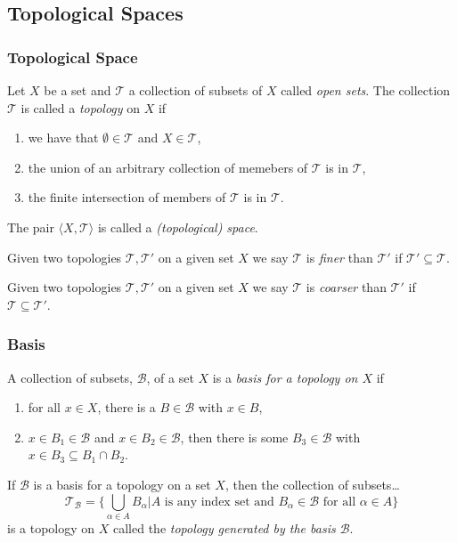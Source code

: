 \subsection{Topological Spaces}

\subsubsection{Topological Space}\label{topologicalspace}
Let $X$ be a set and $\mathcal{T}$ a collection of subsets of $X$ called \emph{open sets}. The collection $\mathcal{T}$ is called a \emph{topology} on $X$ if
\begin{enumerate}
  \item we have that $\emptyset \in \mathcal{T}$ and $X \in \mathcal{T}$,
  \item the union of an arbitrary collection of memebers of $\mathcal{T}$ is in $\mathcal{T}$,
  \item the finite intersection of members of $\mathcal{T}$ is in $\mathcal{T}$.
\end{enumerate}
The pair $\langle X, \mathcal{T} \rangle$ is called a \emph{(topological) space}.

\label{finer}

Given two topologies $\mathcal{T},\mathcal{T}'$ on a given set $X$ we say $\mathcal{T}$ is \emph{finer} than $\mathcal{T}'$ if $\mathcal{T}' \subseteq \mathcal{T}$.

\label{coaser}

Given two topologies $\mathcal{T},\mathcal{T}'$ on a given set $X$ we say $\mathcal{T}$ is \emph{coarser} than $\mathcal{T}'$ if $\mathcal{T} \subseteq \mathcal{T}'$.

\subsubsection{Basis}\label{basis}

A collection of subsets, $\mathcal{B}$, of a set $X$ is a \emph{basis for a topology on $X$} if
\begin{enumerate}
  \item for all $x \in X$, there is a $B \in \mathcal{B}$ with $x \in B$,
  \item $x \in B_1 \in \mathcal{B}$ and $x \in B_2 \in \mathcal{B}$, then there is some $B_3 \in \mathcal{B}$ with $x \in B_3 \subseteq B_1 \cap B_2$.
\end{enumerate}

\begin{proposition}
If $\mathcal{B}$ is a basis for a topology on a set $X$, then the collection of subsets\dots
$$\mathcal{T}_{\mathcal{B}} = \{\bigcup_{\alpha \in A} B_{\alpha} | A \textrm{ is any index set and }B_{\alpha} \in \mathcal{B} \textrm{ for all } \alpha \in A \}$$
is a topology on $X$ called the \emph{topology generated by the basis $\mathcal{B}$}.
\end{proposition}

